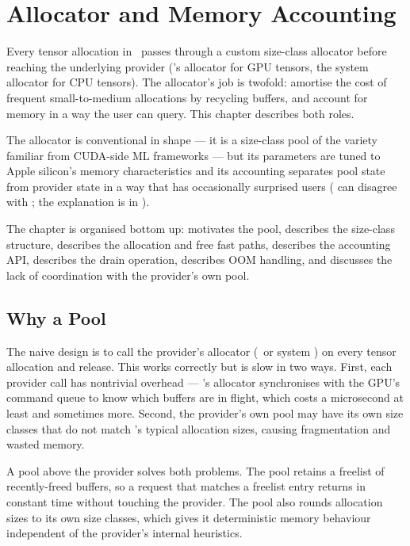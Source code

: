 \chapter{Allocator and Memory Accounting}
\label{ch:allocator}

Every tensor allocation in \Lucid\ passes through a custom size-class
allocator before reaching the underlying provider (\MLX's allocator
for GPU tensors, the system allocator for CPU tensors). The
allocator's job is twofold: amortise the cost of frequent
small-to-medium allocations by recycling buffers, and account for
memory in a way the user can query. This chapter describes both
roles.

The allocator is conventional in shape --- it is a size-class pool
of the variety familiar from CUDA-side ML frameworks --- but its
parameters are tuned to Apple silicon's memory characteristics and
its accounting separates pool state from provider state in a way
that has occasionally surprised users (
can disagree with ; the explanation is in
).

The chapter is organised bottom up: 
motivates the pool,  describes
the size-class structure,  describes
the allocation and free fast paths,
 describes the accounting API,
 describes the drain operation,
 describes OOM handling, and
 discusses the lack of
coordination with the provider's own pool.

\section{Why a Pool}
\label{sec:allocator:why}

The naive design is to call the provider's allocator
(\MLX\ or system ) on every tensor allocation and
release. This works correctly but is slow in two ways. First, each
provider call has nontrivial overhead --- \MLX's allocator
synchronises with the GPU's command queue to know which buffers are
in flight, which costs a microsecond at least and sometimes more.
Second, the provider's own pool may have its own size classes that
do not match \Lucid's typical allocation sizes, causing
fragmentation and wasted memory.

A pool above the provider solves both problems. The pool retains a
freelist of recently-freed buffers, so a request that matches a
freelist entry returns in constant time without touching the
provider. The pool also rounds allocation sizes to its own size
classes, which gives it deterministic memory behaviour independent
of the provider's internal heuristics.

